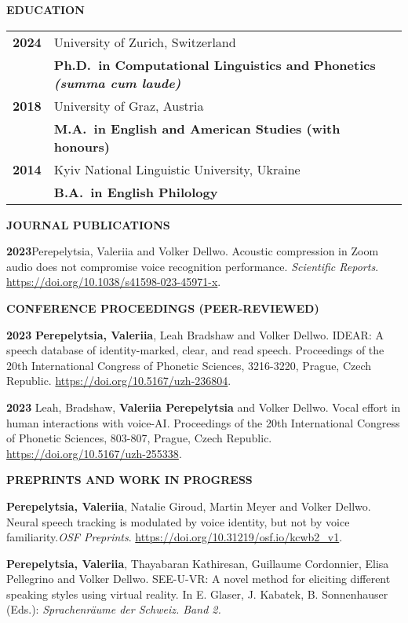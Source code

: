 \documentclass[11pt]{article}
\newcommand{\hangpara}{
 \setlength{\parindent}{0in} %
 \hangindent=0.42in %
}
\begin{document}
\vskip 12pt
\begin{flushleft}
{\bf EDUCATION}
\end{flushleft}
\begin{tabular}{lp{5.5in}}
\bf 2024 & University of Zurich, Switzerland \\
& \textbf{Ph.D.\ in Computational Linguistics and Phonetics \textit{(summa cum laude)}} \\
\bf 2018 & University of Graz, Austria \\
& \textbf{M.A.\ in English and American Studies (with honours)} \\
\bf 2014 & Kyiv National Linguistic University, Ukraine \\
& \textbf{B.A.\ in English Philology} \\
\end{tabular}





\vskip 18pt
\begin{flushleft}
{\bf JOURNAL PUBLICATIONS}
\end{flushleft}
\vskip 6pt
\hangpara
{\bf 2023}\hspace{1ex}Perepelytsia, Valeriia and Volker Dellwo. Acoustic compression in Zoom audio does not compromise voice recognition performance. \textit{Scientific Reports}. \url{https://doi.org/10.1038/s41598-023-45971-x}.





\vskip 18pt
\begin{flushleft}
{\bf CONFERENCE PROCEEDINGS (PEER-REVIEWED)}
\end{flushleft}
\vskip 6pt
\hangpara
{\bf 2023}\hspace{1ex} \textbf{Perepelytsia, Valeriia}, Leah Bradshaw and Volker Dellwo. IDEAR: A speech database of identity-marked, clear, and read speech. Proceedings of the 20th International Congress of Phonetic Sciences, 3216-3220, Prague, Czech Republic. \url{https://doi.org/10.5167/uzh-236804}.
\vskip 6pt
\hangpara
{\bf 2023}\hspace{1ex} Leah, Bradshaw, \textbf{Valeriia Perepelytsia} and Volker Dellwo. Vocal effort in human interactions with voice-AI. Proceedings of the 20th International Congress of Phonetic Sciences, 803-807, Prague, Czech Republic. \url{https://doi.org/10.5167/uzh-255338}.




\vskip 20pt
\begin{flushleft}
{\bf PREPRINTS AND WORK IN PROGRESS}
\end{flushleft}
\vskip 6pt
\hangpara
\textbf{Perepelytsia, Valeriia}, Natalie Giroud, Martin Meyer and Volker Dellwo. Neural speech tracking is modulated by voice identity, but not by voice familiarity.{\it OSF Preprints}. \url{https://doi.org/10.31219/osf.io/kcwb2_v1}.
\vskip 6pt
\hangpara
\textbf{Perepelytsia, Valeriia}, Thayabaran Kathiresan, Guillaume Cordonnier, Elisa Pellegrino and Volker Dellwo. SEE-U-VR: A novel method for eliciting different speaking styles  using virtual reality. In E. Glaser, J. Kabatek, B. Sonnenhauser (Eds.): \textit{Sprachenräume der Schweiz. Band 2.}
\end{document}
